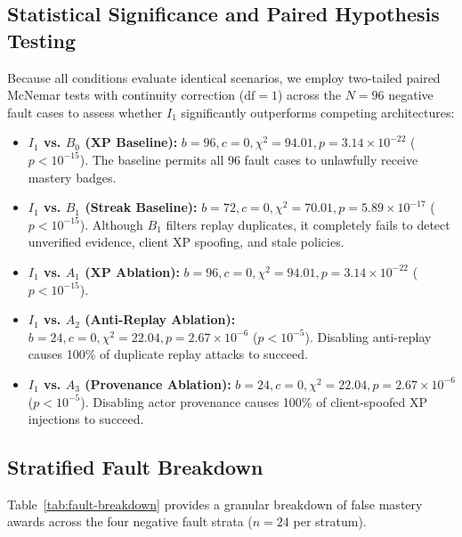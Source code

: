 \documentclass[11pt,a4paper]{article}
\begin{document}
\subsection{Statistical Significance and Paired Hypothesis Testing}
Because all conditions evaluate identical scenarios, we employ two-tailed paired McNemar tests with continuity correction ($\text{df} = 1$) across the $N = 96$ negative fault cases to assess whether $I_1$ significantly outperforms competing architectures:
\begin{itemize}[leftmargin=*]
    \item \textbf{$I_1$ vs. $B_0$ (XP Baseline):} $b = 96, c = 0, \chi^2 = 94.01, p = 3.14 \times 10^{-22}$ ($p < 10^{-15}$). The baseline permits all 96 fault cases to unlawfully receive mastery badges.
    \item \textbf{$I_1$ vs. $B_1$ (Streak Baseline):} $b = 72, c = 0, \chi^2 = 70.01, p = 5.89 \times 10^{-17}$ ($p < 10^{-15}$). Although $B_1$ filters replay duplicates, it completely fails to detect unverified evidence, client XP spoofing, and stale policies.
    \item \textbf{$I_1$ vs. $A_1$ (XP Ablation):} $b = 96, c = 0, \chi^2 = 94.01, p = 3.14 \times 10^{-22}$ ($p < 10^{-15}$).
    \item \textbf{$I_1$ vs. $A_2$ (Anti-Replay Ablation):} $b = 24, c = 0, \chi^2 = 22.04, p = 2.67 \times 10^{-6}$ ($p < 10^{-5}$). Disabling anti-replay causes 100\% of duplicate replay attacks to succeed.
    \item \textbf{$I_1$ vs. $A_3$ (Provenance Ablation):} $b = 24, c = 0, \chi^2 = 22.04, p = 2.67 \times 10^{-6}$ ($p < 10^{-5}$). Disabling actor provenance causes 100\% of client-spoofed XP injections to succeed.
\end{itemize}

\subsection{Stratified Fault Breakdown}
Table~\ref{tab:fault-breakdown} provides a granular breakdown of false mastery awards across the four negative fault strata ($n = 24$ per stratum).
\end{document}
